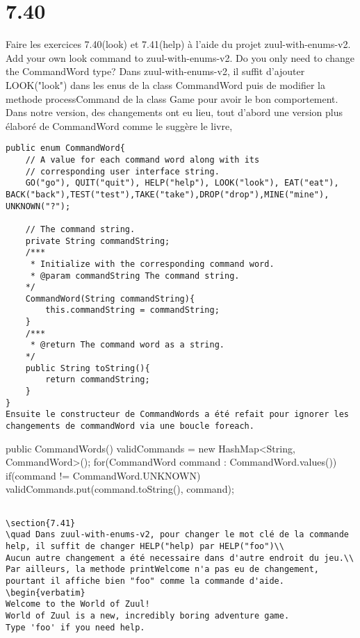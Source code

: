 \documentclass[a4paper , 10pt]{article}
\begin{document}
\section{7.40}
Faire les exercices 7.40(look) et 7.41(help) à l'aide du projet zuul-with-enums-v2.
\\Add your own look command to zuul-with-enums-v2. Do you only need to change the CommandWord type?
\quad Dans zuul-with-enums-v2, il suffit d'ajouter LOOK("look") dans les enus de la class CommandWord puis de modifier la methode processCommand
 de la class Game pour avoir le bon comportement.
\\
Dans notre version, des changements ont eu lieu, tout d'abord une version plus élaboré de CommandWord comme le suggère le livre,
\begin{verbatim}
public enum CommandWord{    
    // A value for each command word along with its
    // corresponding user interface string.
    GO("go"), QUIT("quit"), HELP("help"), LOOK("look"), EAT("eat"), BACK("back"),TEST("test"),TAKE("take"),DROP("drop"),MINE("mine"), UNKNOWN("?");

    // The command string.
    private String commandString;
    /*** 
     * Initialize with the corresponding command word.
     * @param commandString The command string.
    */
    CommandWord(String commandString){
        this.commandString = commandString;
    }
    /*** 
     * @return The command word as a string.
    */
    public String toString(){
        return commandString;
    }
}
Ensuite le constructeur de CommandWords a été refait pour ignorer les changements de commandWord via une boucle foreach.
\end{verbatim}
    public CommandWords()
    {
        validCommands = new HashMap<String, CommandWord>();
        for(CommandWord command : CommandWord.values()) {
            if(command != CommandWord.UNKNOWN) {
                validCommands.put(command.toString(), command);
            }
        }
    }
\begin{verbatim}

\section{7.41}
\quad Dans zuul-with-enums-v2, pour changer le mot clé de la commande help, il suffit de changer HELP("help) par HELP("foo")\\
Aucun autre changement a été necessaire dans d'autre endroit du jeu.\\
Par ailleurs, la methode printWelcome n'a pas eu de changement, pourtant il affiche bien "foo" comme la commande d'aide.
\begin{verbatim}
Welcome to the World of Zuul!
World of Zuul is a new, incredibly boring adventure game.
Type 'foo' if you need help.
\end{verbatim}
\end{document}
